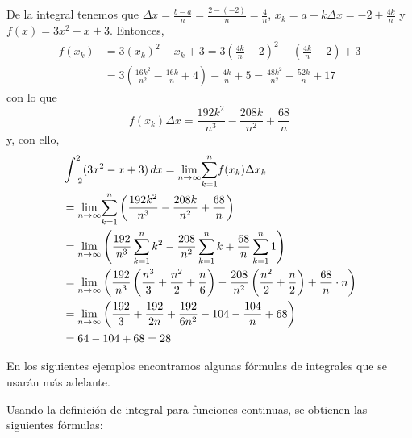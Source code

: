 \begin{enumerate}[leftmargin=1.2em,   itemindent=0pt,       labelwidth=\labelwidth,labelsep=0.5em,]
De la integral tenemos que $\Delta x=\frac{b-a}{n}=\frac{2-\left( -2\right)}{n}=\frac{4}{n}$, $x_{k}=a+k\Delta x=-2+\frac{4k}{n}$ y $f\left( x\right)=3x^{2}-x+3$. Entonces,
\begin{align*}
f\left( x_{k}\right) &=3\left( x_{k}\right) ^{2}-x_{k}+3 %
=3\left( \frac{4k}{n}-2\right) ^{2}-\left( \frac{4k}{n}-2\right) +3 \\
&=3\left( \frac{16k^{2}}{n^{2}}-\frac{16k}{n}+4\right) -\frac{4k}{n}+5 %
=\frac{48k^{2}}{n^{2}}-\frac{52k}{n}+17
\end{align*}
con lo que
\[
f(x_{k})\Delta x=\frac{192k^{2}}{n^{3}}-\frac{208k}{n^{2}}+\frac{68}{n}
\]
y, con ello,
{\small
\begin{align*}
&\int_{-2}^{2}(3x^{2}-x+3)\,dx=\underset{n\rightarrow \infty }{\lim }\overset{n}{\underset{k=1}{\sum }}f(x_{k})\Delta x_{k} \\
&=\underset{n\rightarrow \infty }{\lim }\overset{n}{\underset{k=1}{\sum }}
\left( \frac{192k^{2}}{n^{3}}-\frac{208k}{n^{2}}+\frac{68}{n}\right) \\&
=\underset{n\rightarrow \infty }{\lim }\left( \frac{192}{n^{3}}%
\sum\limits_{k=1}^{n}k^{2}-\frac{208}{n^{2}}\sum\limits_{k=1}^{n}k+\frac{68%
}{n}\sum\limits_{k=1}^{n}1\right) \\
&=\underset{n\rightarrow \infty }{\lim }\left( \frac{192}{n^{3}}\left( \frac{%
n^{3}}{3}+\frac{n^{2}}{2}+\frac{n}{6}\right) -\frac{208}{n^{2}}\left( \frac{%
n^{2}}{2}+\frac{n}{2}\right) +\frac{68}{n}\cdot n\right) \\
&=\underset{n\rightarrow \infty }{\lim }\left( \frac{192}{3}+\frac{192}{2n}+%
\frac{192}{6n^{2}}-104-\frac{104}{n}+68\right) \\
&=64-104+68=28
\end{align*}
}

\end{enumerate}


En los siguientes ejemplos encontramos algunas fórmulas de integrales que se usarán más adelante.


\begin{ejemplo}
\textnormal{Usando la definición de integral para funciones continuas, se
obtienen las siguientes fórmulas:}
\end{ejemplo}


